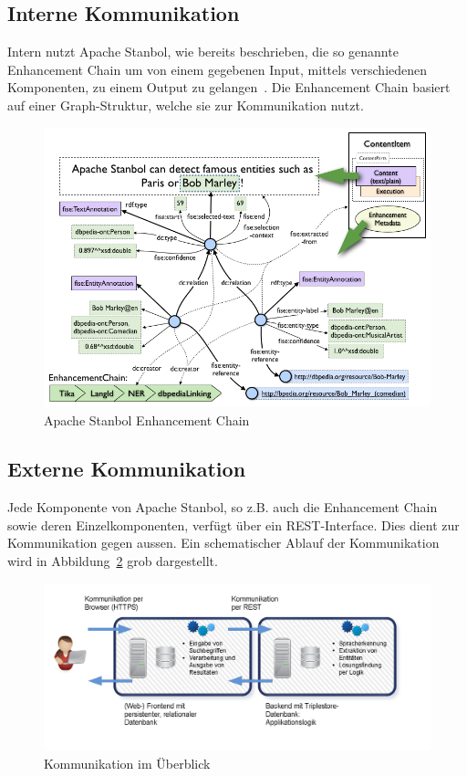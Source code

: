 \subsection{Interne Kommunikation}
\label{sec:architektur_schnittstellen_intern}
Intern nutzt Apache Stanbol, wie bereits beschrieben, die so genannte Enhancement Chain um von einem gegebenen Input, mittels verschiedenen Komponenten, zu einem Output zu gelangen~\cite{stanbol:enhancementchain}. Die Enhancement Chain basiert auf einer Graph-Struktur, welche sie zur Kommunikation nutzt.

\begin{figure}[H]
	\centering
    \includegraphics[scale=0.4]{bilder/enhancementstructure.png}
	\caption{Apache Stanbol Enhancement Chain\protect\footnotemark}
\label{fig:kommunikationKomponenten}
\end{figure}

\newpage

\subsection{Externe Kommunikation}
\label{sec:architektur_schnittstellen_extern}
Jede Komponente von Apache Stanbol, so z.B. auch die Enhancement Chain sowie deren Einzelkomponenten, verfügt über ein REST-Interface. Dies dient zur Kommunikation gegen aussen. Ein schematischer Ablauf der Kommunikation wird in Abbildung~\ref{fig:kommunikationKomponenten} grob dargestellt.

\begin{figure}[H]
	\centering
	\includegraphics[scale=0.4]{bilder/software_komponenten.png}
	\caption{Kommunikation im Überblick\protect\footnotemark}
\label{fig:kommunikationKomponenten}
\end{figure}
